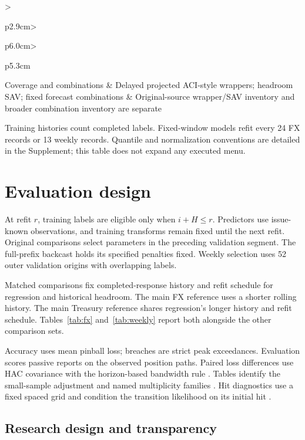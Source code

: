 \documentclass[11pt,a4paper]{article}
\begin{document}
\begin{table}[htbp]
\begin{tabular}{>{\raggedright\arraybackslash}p{2.9cm}>{\raggedright\arraybackslash}p{6.0cm}>{\raggedright\arraybackslash}p{5.3cm}}
Coverage and combinations & Delayed projected ACI-style wrappers; headroom SAV; fixed forecast combinations & Original-source wrapper/SAV inventory and broader combination inventory are separate\\
\bottomrule\end{tabular}
\par\smallskip\begin{minipage}{.98\linewidth}\footnotesize Training histories count completed labels. Fixed-window models refit every 24 FX records or 13 weekly records. Quantile and normalization conventions are detailed in the Supplement; this table does not expand any executed menu.\end{minipage}
\end{table}

\FloatBarrier

\section{Evaluation design}\label{sec:evaluation}

At refit \(r\), training labels are eligible only when \(i+H\le r\). Predictors use issue-known observations, and training transforms remain fixed until the next refit. Original comparisons select parameters in the preceding validation segment. The full-prefix backcast holds its specified penalties fixed. Weekly selection uses 52 outer validation origins with overlapping labels.

Matched comparisons fix completed-response history and refit schedule for regression and historical headroom. The main FX reference uses a shorter rolling history. The main Treasury reference shares regression's longer history and refit schedule. Tables~\ref{tab:fx} and~\ref{tab:weekly} report both alongside the other comparison sets.

Accuracy uses mean pinball loss; breaches are strict peak exceedances. Evaluation scores passive reports on the observed position paths. Paired loss differences use HAC covariance with the horizon-based bandwidth rule \citep{dm1995,nw1987}. Tables identify the small-sample adjustment and named multiplicity families \citep{hln1997,holm1979}. Hit diagnostics use a fixed spaced grid and condition the transition likelihood on its initial hit \citep{kupiec1995,christ1998}.

\subsection{Research design and transparency}
\end{document}
